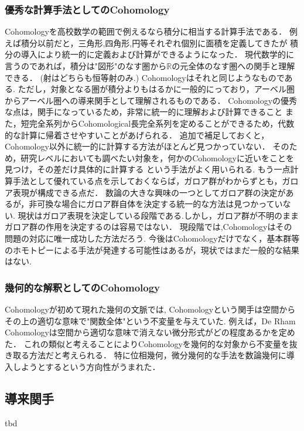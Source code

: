 \documentclass{ujarticle}
\begin{document}
\subsubsection{優秀な計算手法としてのCohomology}
\label{sub:優秀な計算手法としてのCohomology}
Cohomologyを高校数学の範囲で例えるなら積分に相当する計算手法である．
例えば積分以前だと，三角形,四角形,円等それぞれ個別に面積を定義してきたが
積分の導入により統一的に定義および計算ができるようになった．
現代数学的に言うのであれば，積分は"図形"のなす圏から$\mathbb{R}$の元全体のなす圏への関手と理解できる．
(射はどちらも恒等射のみ.)
Cohomologyはそれと同じようなものである.
ただし，対象となる圏が積分よりもはるかに一般的にっており，アーベル圏からアーベル圏への導来関手として理解されるものである．
Cohomologyの優秀な点は，関手になっているため，非常に統一的に理解および計算できること
また，短完全系列からCohomological長完全系列を定めることができるため，代数的な計算に帰着させやすいことがあげられる．
追加で補足しておくと，Cohomology以外に統一的に計算する方法がほとんど見つかっていない．
そのため，研究レベルにおいても調べたい対象を，何かのCohomologyに近いをことを見つけ，その差だけ具体的に計算する
という手法がよく用いられる.
もう一点計算手法として優れている点を示しておくならば，ガロア群がわからずとも，ガロア表現が構成できる点だ．
数論の大きな興味の一つとしてガロア群の決定があるが，非可換な場合にガロア群自体を決定する統一的な方法は見つかっていない.
現状はガロア表現を決定している段階である.しかし，ガロア群が不明のままガロア群の作用を決定するのは容易ではない．
現段階では,Cohomologyはその問題の対応に唯一成功した方法だろう.
今後はCohomologyだけでなく，基本群等のホモトピーによる手法が発達する可能性はあるが，現状ではまだ一般的な結果はない.
\subsubsection{幾何的な解釈としてのCohomology}
\label{sub:幾何的な解釈としてのCohomology}
Cohomologyが初めて現れた幾何の文脈では,
Cohomologyという関手は空間からその上の適切な意味で"関数全体"という不変量を与えていた.
例えば，De Rham Cohomologyは空間から適切な意味で消えない微分形式がどの程度あるかを定めた．
これの類似と考えることによりCohomologyを幾何的な対象から不変量を抜き取る方法だと考えられる．
特に位相幾何，微分幾何的な手法を数論幾何に導入しようとするという方向性がうまれた．

\subsection{導来関手}
\label{sub:導来関手}
tbd
\end{document}
